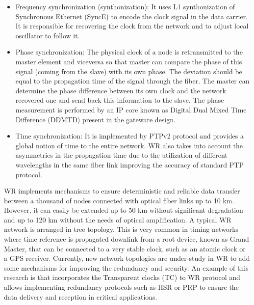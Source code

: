 \begin{itemize}
	\item {Frequency synchronization (synthonization): It uses L1 synthonization of Synchronous Ethernet (SyncE) to encode the clock signal in the data carrier. It is responsible for recovering the clock from the network and to adjust local oscillator to follow it.}
	\item {Phase synchronization: The physical clock of a node is retransmitted to the master element and viceversa so that master can compare the phase of this signal (coming from the slave) with its own phase. The deviation should be equal to the propagation time of the signal through the fiber. The master can determine the phase difference between its own clock and the network recovered one and send back this information to the slave. The phase measurement is performed by an IP core known as Digital Dual Mixed Time Difference (DDMTD) present in the gateware design.}
	\item {Time synchronization: It is implemented by PTPv2 protocol and provides a global notion of time to the entire network. WR also takes into account the asymmetries in the propagation time due to the utilization of different wavelengths in the same fiber link improving the accuracy of standard PTP protocol.}
\end{itemize}


WR implements mechanisms to ensure deterministic and reliable data transfer between a thousand of nodes connected with  optical fiber links up to 10 km. However, it can easily be extended up to 50 km without significant degradation and up to 120 km without the needs of optical amplification. A typical WR network is arranged in tree topology. This is very common in timing networks where time reference is propagated downlink from a root device, known as Grand Master, that can be connected to a very stable clock, such as an atomic clock or a GPS receiver. Currently, new network topologies are under-study in WR to add some mechanisms for improving the redundancy and security. An example of this research is \cite{jlgutierrez-paper-redundancy} that incorporates the Transparent clocks (TC) to WR protocol and allows implementing redundancy protocols such as HSR or PRP to ensure the data delivery and reception in critical applications.

